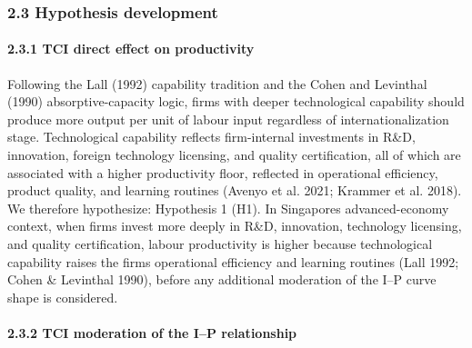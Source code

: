 \documentclass[12pt,a4paper]{article}
\begin{document}
\hypertarget{23-hypothesis-development}{%
\subsubsection{2.3 Hypothesis
development}\label{23-hypothesis-development}}

\hypertarget{231-tci-direct-effect-on-productivity}{%
\paragraph{2.3.1 TCI direct effect on
productivity}\label{231-tci-direct-effect-on-productivity}}

Following the Lall (1992) capability tradition and the Cohen and
Levinthal (1990) absorptive-capacity logic, firms with deeper
technological capability should produce more output per unit of labour
input regardless of internationalization stage. Technological capability
reflects firm-internal investments in R\&D, innovation, foreign
technology licensing, and quality certification, all of which are
associated with a higher productivity floor, reflected in operational
efficiency, product quality, and learning routines (Avenyo et al. 2021;
Krammer et al. 2018). We therefore hypothesize: Hypothesis 1 (H1). In
Singapore\textquotesingle s advanced-economy context, when firms invest
more deeply in R\&D, innovation, technology licensing, and quality
certification, labour productivity is higher because technological
capability raises the firm\textquotesingle s operational efficiency and
learning routines (Lall 1992; Cohen \& Levinthal 1990), before any
additional moderation of the I--P curve shape is considered.

\hypertarget{232-tci-moderation-of-the-ip-relationship}{%
\paragraph{2.3.2 TCI moderation of the I--P
relationship}\label{232-tci-moderation-of-the-ip-relationship}}
\end{document}
